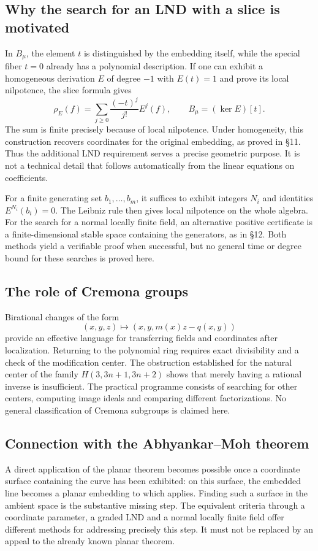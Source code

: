 \subsection*{Why the search for an LND with a slice is motivated}
In $B_\mu$, the element $t$ is distinguished by the embedding itself, while
the special fiber $t=0$ already has a polynomial description. If one can exhibit
a homogeneous derivation $E$ of degree $-1$ with $E(t)=1$ and prove
its local nilpotence, the slice formula gives
\[
 \rho_E(f)=\sum_{j\ge0}\frac{(-t)^j}{j!}E^j(f),\qquad
 B_\mu=(\ker E)[t].
\]
The sum is finite precisely because of local nilpotence. Under
homogeneity, this construction recovers coordinates for the original embedding,
as proved in \S11. Thus the additional LND requirement serves a precise
geometric purpose. It is not a technical detail that follows automatically
from the linear equations on coefficients.

For a finite generating set $b_1,\ldots,b_m$, it suffices to exhibit
integers $N_i$ and identities $E^{N_i}(b_i)=0$. The Leibniz rule then gives
local nilpotence on the whole algebra. For the search for a normal
locally finite field, an alternative positive certificate is a
finite-dimensional stable space containing the generators, as in \S12.
Both methods yield a verifiable proof when successful,
but no general time or degree bound for these searches is proved here.

\subsection*{The role of Cremona groups}
Birational changes of the form
\[
 (x,y,z)\longmapsto (x,y,m(x)z-q(x,y))
\]
provide an effective language for transferring fields and coordinates after
localization. Returning to the polynomial ring requires exact divisibility
and a check of the modification center. The obstruction established for
the natural center of the family $H(3,3n+1,3n+2)$ shows that merely having
a rational inverse is insufficient. The practical programme consists of
searching for other centers, computing image ideals and comparing
different factorizations. No general classification of Cremona subgroups
is claimed here.

\subsection*{Connection with the Abhyankar--Moh theorem}
A direct application of the planar theorem becomes possible once
a coordinate surface containing the curve has been exhibited: on this
surface, the embedded line becomes a planar embedding to which
\cite{AM,Suzuki} applies. Finding such a surface in the ambient space
is the substantive missing step. The equivalent criteria through
a coordinate parameter, a graded LND and a normal locally finite
field offer different methods for addressing precisely this step.
It must not be replaced by an appeal to the already known planar theorem.

